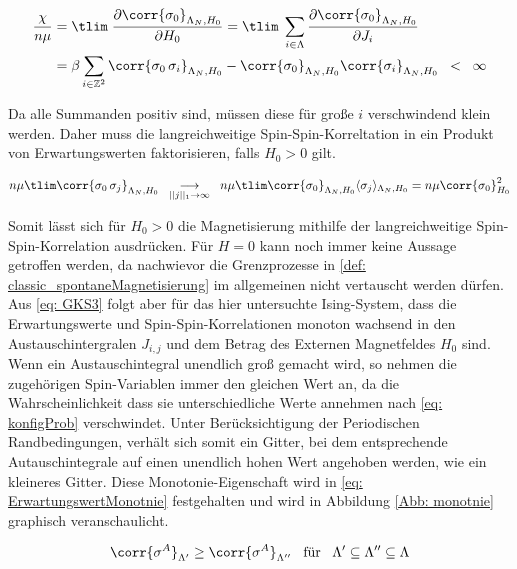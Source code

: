 \begin{align} 
\frac{\chi}{n \mu}
&=  \tlim\; \frac{\partial \corr{\sigma_0}_{\Lambda_N, H_0}}{\partial H_0}  
 = \tlim\; \sum_{i \in \Lambda} \frac{\partial \corr{\sigma_0}_{\Lambda_N, H_0}}{\partial J_i} \\
&= \beta \sum_{i \in \mathbb{Z}^2} \corr{\sigma_0 \, \sigma_i}_{\Lambda_N, H_0} - \corr{\sigma_0}_{\Lambda_N, H_0}\corr{\sigma_i}_{\Lambda_N, H_0} \;\;<\;\; \infty \label{eq:  suszeptibilitaet}
\end{align}

\noindent Da alle Summanden positiv sind, müssen diese für große $i$ verschwindend klein werden. Daher muss die langreichweitige Spin-Spin-Korreltation in ein Produkt von Erwartungswerten faktorisieren, falls $H_0>0$ gilt.

\begin{equation} \label{eq: corrFactorize}
n \mu \tlim \corr{\sigma_0 \,\sigma_j}_{\Lambda_N, H_0} \;\; \underset{||j||_1 \rightarrow \infty}{\longrightarrow} \;\;n \mu \tlim \corr{\sigma_0}_{\Lambda_N, H_0}\langle\sigma_j\rangle_{\Lambda_N, H_0} =  n \mu \corr{\sigma_0}_{H_0}^2 %
\end{equation}

\noindent Somit lässt sich für $H_0 > 0$ die Magnetisierung mithilfe der langreichweitige Spin-Spin-Korrelation ausdrücken. Für $H=0$ kann noch immer keine Aussage getroffen werden, da nachwievor die Grenzprozesse in \eqref{def: classic_spontaneMagnetisierung} im allgemeinen nicht vertauscht werden dürfen. Aus \eqref{eq: GKS3} folgt aber für das hier untersuchte Ising-System, dass die Erwartungswerte und Spin-Spin-Korrelationen monoton wachsend in den Austauschintergralen $J_{i,j}$ und dem Betrag des Externen Magnetfeldes $H_0$ sind. Wenn ein Austauschintegral unendlich groß gemacht wird, so nehmen die zugehörigen Spin-Variablen immer den gleichen Wert an, da die Wahrscheinlichkeit dass sie unterschiedliche Werte annehmen nach \eqref{eq: konfigProb} verschwindet. Unter Berücksichtigung der Periodischen Randbedingungen, verhält sich somit ein Gitter, bei dem entsprechende Autauschintegrale auf einen unendlich hohen Wert angehoben werden, wie ein kleineres Gitter. Diese Monotonie-Eigenschaft wird in \eqref{eq: ErwartungswertMonotnie} festgehalten und wird in Abbildung \ref{Abb: monotnie} graphisch veranschaulicht.

\begin{equation} \label{eq: ErwartungswertMonotnie}
    \corr{\sigma^A}_{\Lambda'} \geq \corr{\sigma^A}_{\Lambda''} \;\;\; \text{für} \;\;\; \Lambda' \subseteq \Lambda'' \subseteq \Lambda
\end{equation}

